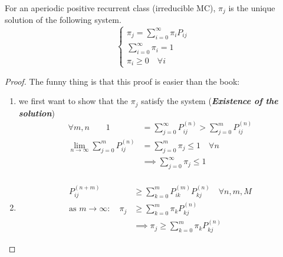 	\begin{theorem}
		For an aperiodic positive recurrent class (irreducible MC), $\pi_j$ is the unique solution of the following system.
		\begin{equation*}\begin{cases}
			\pi_j = \sum\limits_{i=0}^\infty \pi_i P_{ij} \\
			\sum\limits_{i=0}^\infty \pi_i = 1 \\
			\pi_i \geq 0 \quad \forall i
		\end{cases}\end{equation*}
	\end{theorem}

	\begin{proof} The funny thing is that this proof is easier than the book:
		\begin{enumerate}
			\item
			we first want to show that the $\pi_j$ satisfy the system (\textbf{\textit{Existence of the solution}})
			\begin{equation*}
				\begin{split}
					\forall m,n \qquad 1&=\sum\limits_{j=0}^\infty P_{ij}^{(n)} > \sum\limits_{j=0}^m P_{ij}^{(n)}\\
	 			 \lim_{n\to\infty} \sum\limits_{j=0}^m P_{ij}^{(n)} &= \sum\limits_{j=0}^m \pi_j \leq 1 \quad \forall n \\
				 &\implies \sum\limits_{j=0}^\infty \pi_j \leq 1\\
				\end{split}
			\end{equation*}

			\item
			\begin{equation*}
				\begin{split}
					P_{ij}^{(n+m)} &\geq \sum\limits_{k=0}^m P_{ik}^{(m)} P_{kj}^{(n)} \quad \forall n, m, M\\
					\text{as } m \to \infty :\quad \pi_j &\geq \sum\limits_{k=0}^m \pi_k P_{kj}^{(n)}\\
					&\implies  \pi_j \geq \sum\limits_{k=0}^m \pi_k P_{kj}^{(n)}
				\end{split}
			\end{equation*}


\end{enumerate}
\end{proof}
